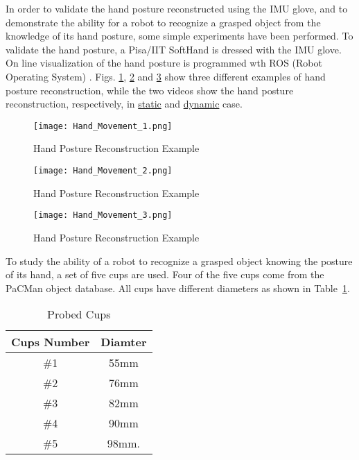 In order to validate the hand posture reconstructed using the IMU glove, and to demonstrate the ability for a robot to recognize a grasped object from the knowledge of its hand posture, some simple experiments have been performed.
To validate the hand posture, a Pisa/IIT SoftHand is dressed with the IMU glove. On line visualization of the hand posture is programmed wth ROS (Robot Operating System) \cite{Ros_homepage}. Figs. \ref{fig:hand_reconstruction_1}, \ref{fig:hand_reconstruction_2} and \ref{fig:hand_reconstruction_3} show three different examples of hand posture reconstruction, while the two videos show the hand posture reconstruction, respectively, in \href{https://www.youtube.com/watch?v=0oVha0Q1vWM}{static} and \href{https://www.youtube.com/watch?v=bceOXa990-Q}{dynamic} case.

\begin{figure}[h]
\centering
\texttt{[image: Hand\_Movement\_1.png]}
\caption{Hand Posture Reconstruction Example}
\label{fig:hand_reconstruction_1}
\end{figure}

\begin{figure}[h]
\centering
\texttt{[image: Hand\_Movement\_2.png]}
\caption{Hand Posture Reconstruction Example}
\label{fig:hand_reconstruction_2}
\end{figure}

\begin{figure}[h]
\centering
\texttt{[image: Hand\_Movement\_3.png]}
\caption{Hand Posture Reconstruction Example}
\label{fig:hand_reconstruction_3}
\end{figure}

To study the ability of a robot to recognize a grasped object knowing the posture of its hand, a set of five cups are used. Four of the five cups come from the PaCMan object database. All cups have different diameters as shown in Table~\ref{tab:cups}.

\begin{table}[tb]\footnotesize
\begin{tabular}{cc} \hline \hline
Cups Number & Diamter \\ \hline
\#1 & 55mm \\
\#2 & 76mm \\
\#3 & 82mm \\
\#4 & 90mm \\
\#5 & 98mm.
\end{tabular}
\caption{Probed Cups}
\label{tab:cups}
\end{table}

